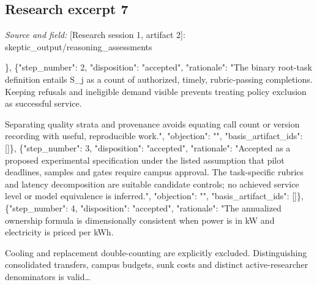 \documentclass[11pt]{article}
\begin{document}
\subsection{Research excerpt 7}
\textit{Source and field: }[Research session 1, artifact 2]: skeptic\_output/reasoning\_assessments\par
[\{"step\_number": 1, "disposition": "accepted", "rationale": "The feature attribution matches the supplied project description, and the four baseline definitions preserve the distinction between the published campus gateway and hypothetical extensions. The stated 2026-10-31 date is correctly identified as supplied history, not this session's access date.", "objection": "", "basis\_artifact\_ids": []\}, \{"step\_number": 2, "disposition": "accepted", "rationale": "The binary root-task definition entails S\_j as a count of authorized, timely, rubric-passing completions. Keeping refusals and ineligible demand visible prevents treating policy exclusion as successful service.

Separating quality strata and provenance avoids equating call count or version recording with useful, reproducible work.", "objection": "", "basis\_artifact\_ids": []\}, \{"step\_number": 3, "disposition": "accepted", "rationale": "Accepted as a proposed experimental specification under the listed assumption that pilot deadlines, samples and gates require campus approval. The task-specific rubrics and latency decomposition are suitable candidate controls; no achieved service level or model equivalence is inferred.", "objection": "", "basis\_artifact\_ids": []\}, \{"step\_number": 4, "disposition": "accepted", "rationale": "The annualized ownership formula is dimensionally consistent when power is in kW and electricity is priced per kWh.

Cooling and replacement double-counting are explicitly excluded. Distinguishing consolidated transfers, campus budgets, sunk costs and distinct active-researcher denominators is valid\ldots{}
\end{document}
